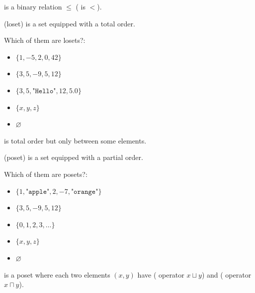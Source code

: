 \documentclass{article}
\begin{document}
\plush{}



 is a binary relation \(\leq\) ( is \(<\)).

 (loset) is a set equipped with a total order.

Which of them are losets?:

\begin{itemize}[label={}]
\item \(\{ 1, -5, 2, 0, 42 \}\)
\item \(\{ 3, 5, -9, 5, 12 \}\)
\item \(\{ 3, 5, \texttt{"Hello"}, 12, 5.0 \}\)
\item \(\{ x, y, z \}\)
\item \(\varnothing\)
\end{itemize}

\plush{}


 is total order but only between some elements.

 (poset) is a set equipped with a partial order.

Which of them are posets?:

\begin{itemize}[label={}]
\item \(\{ 1, \texttt{"apple"}, 2, -7, \texttt{"orange"} \}\)
\item \(\{ 3, 5, -9, 5, 12 \}\)
\item \(\{ 0, 1, 2, 3, \dots \}\)
\item \(\{ x, y, z \}\)
\item \(\varnothing\)
\end{itemize}

\plush{}


 is a poset where each two elements \((x, y)\) have  ( operator \(x \sqcup y\)) and
 ( operator \(x \sqcap y\)).
\end{document}
